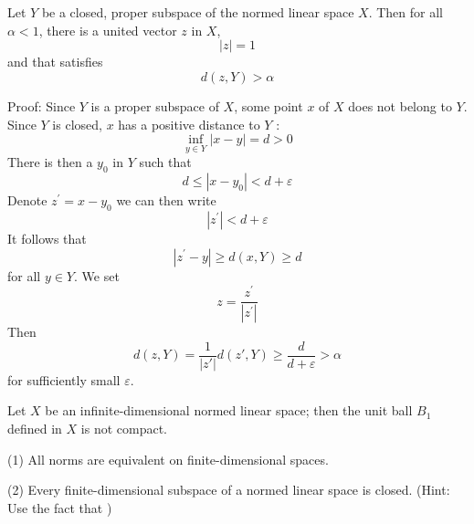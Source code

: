 \documentclass[12pt, oneside]{book}
\begin{document}
\section{}

\begin{lemma}
    Let $Y$ be a closed, proper subspace of the normed linear space $X$. Then for all $\alpha < 1$, there is a united vector $z$ in $X$,
    \begin{equation*}
        |z|=1
    \end{equation*}
    and that satisfies
    \begin{equation*}
        d(z,Y)>\alpha
    \end{equation*}

    Proof:
    Since $Y$ is a proper subspace of $X$, some point $x$ of $X$ does not belong to $Y$. Since $Y$ is closed, $x$ has a positive distance to $Y$ :
    \begin{equation*}
        \inf_{y \in Y}|x-y|=d>0
    \end{equation*}
    There is then a $y_0$ in $Y$ such that
    \begin{equation*}
        d \leq \left|x-y_0\right|< d + \varepsilon
    \end{equation*}
    Denote $z^{\prime}=x-y_0$ we can then write
    \begin{equation*}
        \left|z^{\prime}\right|< d+\varepsilon
    \end{equation*}
    It follows that
    \begin{equation*}
        \left|z^{\prime}-y\right|
        \geq d(x,Y)
        \geq d
    \end{equation*}
    for all  $y \in  Y$.
    We set
    \begin{equation*}
        z=\frac{z^{\prime}}{\left|z^{\prime}\right|}
    \end{equation*}
    Then
    \begin{equation*}
        d(z,Y)
        =
        \frac{1}{\left|z'\right|}d(z',Y)
        \geq
        \frac{d}{d+\varepsilon}
        >\alpha
    \end{equation*}
    for sufficiently small $\varepsilon$.
\end{lemma}

\begin{corollary}
    Let $X$ be an infinite-dimensional normed linear space; then the unit ball $B_1$ defined in $X$ is not compact.
\end{corollary}

\begin{proposition}
    (1) All norms are equivalent on finite-dimensional spaces.

    (2) Every finite-dimensional subspace of a normed linear space is closed. (Hint: Use the fact that )
\end{proposition}
\end{document}
